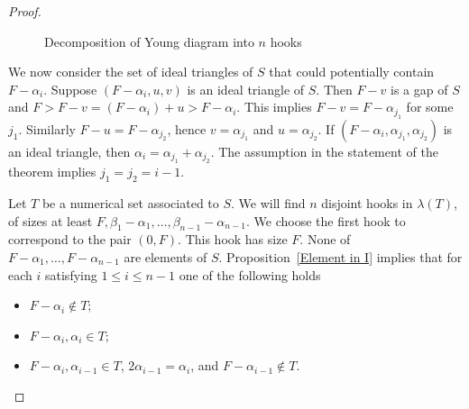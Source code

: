 \documentclass[10pt,a4paper]{amsart}
\begin{document}
\begin{proof}
\begin{center}
\begin{figure}
\caption{Decomposition of Young diagram into $n$ hooks}
\end{figure}
\end{center}

We now consider the set of ideal triangles of $S$ that could potentially contain $F-\alpha_i$. Suppose $(F-\alpha_i,u,v)$ is an ideal triangle of $S$. Then $F-v$ is a gap of $S$ and $F>F-v=(F-\alpha_i)+u>F-\alpha_i$. This implies $F-v=F-\alpha_{j_1}$ for some $j_1$. Similarly $F-u=F-\alpha_{j_2}$, hence $v=\alpha_{j_1}$ and $u=\alpha_{j_2}$. If $(F-\alpha_i,\alpha_{j_1},\alpha_{j_2})$ is an ideal triangle,  then $\alpha_i=\alpha_{j_1}+\alpha_{j_2}$. The assumption in the statement of the theorem implies $j_1=j_2=i-1$.

Let $T$ be a numerical set associated to $S$.
We will find $n$ disjoint hooks in $\lambda(T)$, of sizes at least $F, \beta_1-\alpha_1,\dots,\beta_{n-1}-\alpha_{n-1}$. We choose the first hook to correspond to the pair $(0,F)$. This hook has size $F$.
None of $F-\alpha_1,\ldots, F-\alpha_{n-1}$ are elements of $S$. Proposition~\ref{Element in I} implies that for each $i$ satisfying $1\le i \le n-1$ one of the following holds 
\begin{itemize}
\item $F-\alpha_i\notin T$;
\item $F-\alpha_i,\alpha_i\in T$;
\item $F- \alpha_i, \alpha_{i-1} \in T$, $2\alpha_{i-1} = \alpha_i$, and $F-\alpha_{i-1} \not\in T$.
\end{itemize}


\end{proof}
\end{document}

